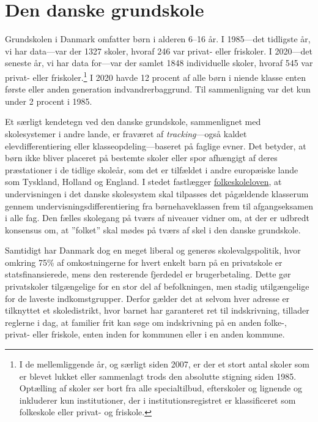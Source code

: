 \documentclass[
]{book}
\begin{document}
\section{Den danske grundskole}\label{den-danske-grundskole}

Grundskolen i Danmark omfatter børn i alderen 6--16 år. I 1985---det tidligste år, vi har data---var der 1327 skoler, hvoraf 246 var privat- eller friskoler. I 2020---det seneste år, vi har data for---var der samlet 1848 individuelle skoler, hvoraf 545 var privat- eller friskoler.\footnote{I de mellemliggende år, og særligt siden 2007, er der et stort antal skoler som er blevet lukket eller sammenlagt trods den absolutte stigning siden 1985. Optælling af skoler ser bort fra alle specialtilbud, efterskoler og lignende og inkluderer kun institutioner, der i institutionsregistret er klassificeret som folkeskole eller privat- og friskole.} I 2020 havde 12 procent af alle børn i niende klasse enten første eller anden generation indvandrerbaggrund. Til sammenligning var det kun under 2 procent i 1985.

Et særligt kendetegn ved den danske grundskole, sammenlignet med skolesystemer i andre lande, er fraværet af \emph{tracking}---også kaldet elevdifferentiering eller klasseopdeling---baseret på faglige evner. Det betyder, at børn ikke bliver placeret på bestemte skoler eller spor afhængigt af deres præstationer i de tidlige skoleår, som det er tilfældet i andre europæiske lande som Tyskland, Holland og England. I stedet fastlægger \href{https://arkiv.emu.dk/sites/default/files/2019-01/Vidensnotat\%20-\%20Undervisningsdifferentiering.pdf}{folkeskoleloven}, at undervisningen i det danske skolesystem skal tilpasses det pågældende klasserum gennem undervisningsdifferentiering fra børnehaveklassen frem til afgangseksamen i alle fag. Den fælles skolegang på tværs af niveauer vidner om, at der er udbredt konsensus om, at ''folket'' skal mødes på tværs af skel i den danske grundskole.

Samtidigt har Danmark dog en meget liberal og generøs skolevalgspolitik, hvor omkring 75\% af omkostningerne for hvert enkelt barn på en privatskole er statsfinansierede, mens den resterende fjerdedel er brugerbetaling. Dette gør privatskoler tilgængelige for en stor del af befolkningen, men stadig utilgængelige for de laveste indkomstgrupper. Derfor gælder det at selvom hver adresse er tilknyttet et skoledistrikt, hvor barnet har garanteret ret til indskrivning, tillader reglerne i dag, at familier frit kan søge om indskrivning på en anden folke-, privat- eller friskole, enten inden for kommunen eller i en anden kommune.
\end{document}
